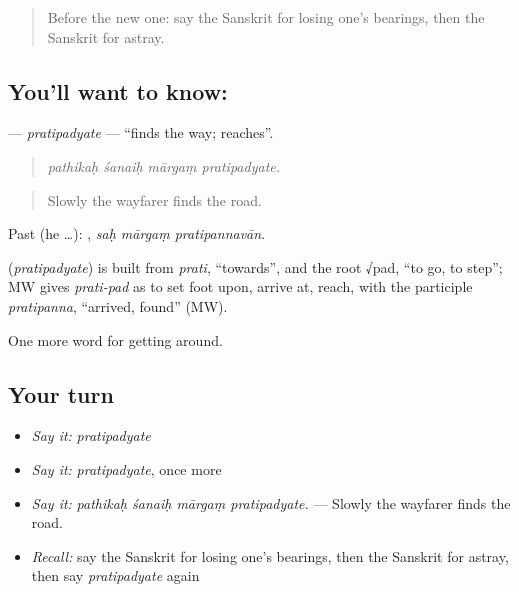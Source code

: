 \label{lesson:SA-C414-pratipadyate}



\begin{quote}
Before the new one: say the Sanskrit for losing one's bearings, then the Sanskrit for astray.
\end{quote}

\subsection*{You'll want to know: }
\textbf{} — \emph{pratipadyate} — \textquotedblleft{}finds the way; reaches\textquotedblright{}.

\begin{quote}
   
\end{quote}

\begin{quote}
\emph{pathikaḥ śanaiḥ mārgaṃ pratipadyate.}
\end{quote}

\begin{quote}
Slowly the wayfarer finds the road.
\end{quote}

Past (he …):   , \emph{saḥ mārgaṃ pratipannavān}.

\begin{cousinweb}
\textbf{} (\emph{pratipadyate}) is built from \emph{prati}, \textquotedblleft{}towards\textquotedblright{}, and the root √pad, \textquotedblleft{}to go, to step\textquotedblright{}; MW gives \emph{prati-pad} as to set foot upon, arrive at, reach, with the participle \emph{pratipanna}, \textquotedblleft{}arrived, found\textquotedblright{} (MW).
\end{cousinweb}

\begin{grammarlens}[title={What you've built}]
One more word for getting around.
\end{grammarlens}

\subsection*{Your turn}
\begin{itemize}
\raggedright
  \item \emph{Say it:} \emph{pratipadyate}
  \item \emph{Say it:} \emph{pratipadyate}, once more
  \item \emph{Say it:} \emph{pathikaḥ śanaiḥ mārgaṃ pratipadyate.} — Slowly the wayfarer finds the road.
  \item \emph{Recall:} say the Sanskrit for losing one's bearings, then the Sanskrit for astray, then say \emph{pratipadyate} again
\end{itemize}

